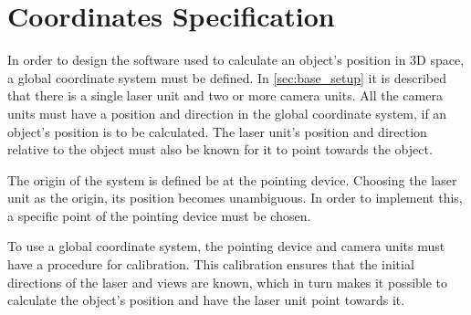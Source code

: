 \section{Coordinates Specification}\label{sec:coor}
In order to design the software used to calculate an object's position in 3D space, a global coordinate system must be defined. In \ref{sec:base_setup} it is described that there is a single laser unit and two or more camera units. All the camera units must have a position and direction in the global coordinate system, if an object's position is to be calculated. The laser unit's position and direction relative to the object must also be known for it to point towards the object.

The origin of the system is defined be at the pointing device. Choosing the laser unit as the origin, its position becomes unambiguous. In order to implement this, a specific point of the pointing device must be chosen. 

To use a global coordinate system, the pointing device and camera units must have a procedure for calibration. This calibration ensures that the initial directions of the laser and views are known, which in turn makes it possible to calculate the object's position and have the laser unit point towards it. 